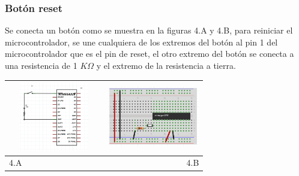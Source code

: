 \documentclass[12]{article}
\newenvironment{Figure}
{\par\medskip\noindent\minipage{\linewidth}}
{\endminipage\par\medskip}
\begin{document}
\begin{multicols}{2}
\subsubsection{Botón reset}
Se conecta un  botón como se muestra en la figuras 4.A y 4.B, para reiniciar el  microcontrolador, se une cualquiera de los  extremos del botón al pin 1 del microcontrolador que es el pin de reset, el otro extremo del botón se conecta  a una resistencia de 1 $K\Omega $ y el extremo de la resistencia a tierra.\\
\begin{Figure}
\center
\begin{tabular}{|l|r|}
\hline
\includegraphics[width=4cm, height=3cm]{img/botonesq.png} & \includegraphics[width=4cm, height=3cm]{img/botonpro.png} \\ \hline
4.A & 4.B \\ \hline
\end{tabular}
\label{fig:g4}
\end{Figure}

\end{multicols}
\end{document}
